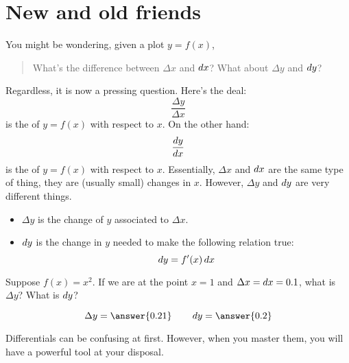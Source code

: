 \documentclass{ximera}
\begin{document}
\section{New and old friends}

You might be wondering, given a plot $y=f(x)$,
\begin{quote}
  What's the difference between $\Delta x$ and $\mathop{}\!d x$? What about
  $\Delta y$ and $\mathop{}\!d y$?
\end{quote}
Regardless, it is now a pressing question. Here's the deal: 
\[
\frac{\Delta y}{\Delta x}
\]
is the  of $y=f(x)$ with respect to $x$.
On the other hand:
\[
\frac{\mathop{}\!d y}{\mathop{}\!d x}
\]
is the  of $y=f(x)$ with respect to
$x$. Essentially, $\Delta x$ and $\mathop{}\!d x$ are the same type of thing,
they are (usually small) changes in $x$. However, $\Delta y$ and $\mathop{}\!d
y$ are very different things.
\begin{itemize}
\item $\Delta y$ is the change of $y$ associated to $\Delta x$.
\item $\mathop{}\!d y$ is the change in $y$ needed to make the following relation true:
  \[
  \mathop{}\!d y = f'(x)\mathop{}\!d x
  \]
\end{itemize}
\begin{question}
  Suppose $f(x) = x^2$. If we are at the point $x=1$ and $\Delta x =\mathop{}\!d x
  = 0.1$, what is $\Delta y$? What is $\mathop{}\!d y$?
  \begin{prompt}
    \[
    \Delta y = \answer{0.21}\qquad \d y = \answer{0.2}
    \]
  \end{prompt}
\end{question}
Differentials can be confusing at first. However, when you master
them, you will have a powerful tool at your disposal.
\end{document}
